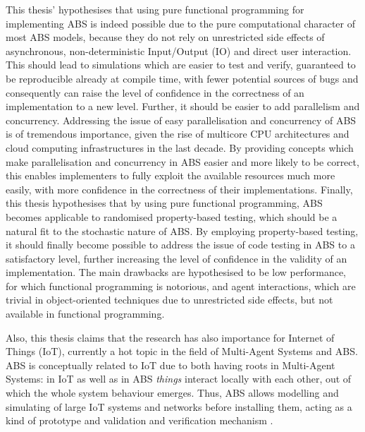 This thesis' hypothesises that using pure functional programming for implementing ABS is indeed possible due to the pure computational character of most ABS models, because they do not rely on unrestricted side effects of asynchronous, non-deterministic Input/Output (IO) and direct user interaction. This should lead to simulations which are easier to test and verify, guaranteed to be reproducible already at compile time, with fewer potential sources of bugs and consequently can raise the level of confidence in the correctness of an implementation to a new level. Further, it should be easier to add parallelism and concurrency. Addressing the issue of easy parallelisation and concurrency of ABS is of tremendous importance, given the rise of multicore CPU architectures and cloud computing infrastructures in the last decade. By providing concepts which make parallelisation and concurrency in ABS easier and more likely to be correct, this enables implementers to fully exploit the available resources much more easily, with more confidence in the correctness of their implementations. Finally, this thesis hypothesises that by using pure functional programming, ABS becomes applicable to randomised property-based testing, which should be a natural fit to the stochastic nature of ABS. By employing property-based testing, it should finally become possible to address the issue of code testing in ABS to a satisfactory level, further increasing the level of confidence in the validity of an implementation. The main drawbacks are hypothesised to be low performance, for which functional programming is notorious, and agent interactions, which are trivial in object-oriented techniques due to unrestricted side effects, but not available in functional programming. 

Also, this thesis claims that the research has also importance for Internet of Things (IoT), currently a hot topic in the field of Multi-Agent Systems and ABS. ABS is conceptually related to IoT due to both having roots in Multi-Agent Systems: in IoT as well as in ABS \textit{things} interact locally with each other, out of which the whole system behaviour emerges. Thus, ABS allows modelling and simulating of large IoT systems and networks before installing them, acting as a kind of prototype and validation and verification mechanism \cite{savaglio_agent-based_2018}.

